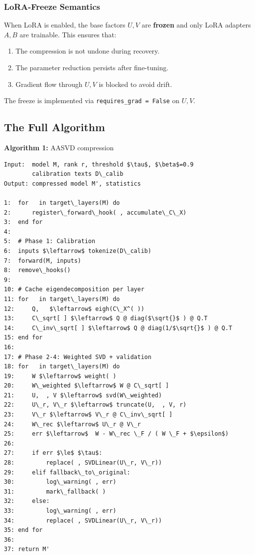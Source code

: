 \subsubsection{LoRA-Freeze Semantics}

When LoRA is enabled, the base factors $U, V$ are \textbf{frozen} and only LoRA 
adapters $A, B$ are trainable. This ensures that:

\begin{enumerate}
\item The compression is not undone during recovery.
\item The parameter reduction persists after fine-tuning.
\item Gradient flow through $U, V$ is blocked to avoid drift.

\end{enumerate}
The freeze is implemented via \texttt{requires\_grad = False} on $U, V$.

\subsection{The Full Algorithm}

\textbf{Algorithm 1:} AASVD compression
\begin{lstlisting}
Input:  model M, rank r, threshold $\tau$, $\beta$=0.9
        calibration texts D\_calib
Output: compressed model M', statistics

1:  for   in target\_layers(M) do
2:      register\_forward\_hook( , accumulate\_C\_X)
3:  end for
4:
5:  # Phase 1: Calibration
6:  inputs $\leftarrow$ tokenize(D\_calib)
7:  forward(M, inputs)
8:  remove\_hooks()
9:
10: # Cache eigendecomposition per layer
11: for   in target\_layers(M) do
12:     Q,   $\leftarrow$ eigh(C\_X^( ))
13:     C\_sqrt[ ] $\leftarrow$ Q @ diag($\sqrt{}$ ) @ Q.T
14:     C\_inv\_sqrt[ ] $\leftarrow$ Q @ diag(1/$\sqrt{}$ ) @ Q.T
15: end for
16:
17: # Phase 2-4: Weighted SVD + validation
18: for   in target\_layers(M) do
19:     W $\leftarrow$ weight( )
20:     W\_weighted $\leftarrow$ W @ C\_sqrt[ ]
21:     U,  , V $\leftarrow$ svd(W\_weighted)
22:     U\_r, V\_r $\leftarrow$ truncate(U,  , V, r)
23:     V\_r $\leftarrow$ V\_r @ C\_inv\_sqrt[ ]
24:     W\_rec $\leftarrow$ U\_r @ V\_r
25:     err $\leftarrow$  W - W\_rec \_F / ( W \_F + $\epsilon$)
26:
27:     if err $\le$ $\tau$:
28:         replace( , SVDLinear(U\_r, V\_r))
29:     elif fallback\_to\_original:
30:         log\_warning( , err)
31:         mark\_fallback( )
32:     else:
33:         log\_warning( , err)
34:         replace( , SVDLinear(U\_r, V\_r))
35: end for
36:
37: return M'
\end{lstlisting}

